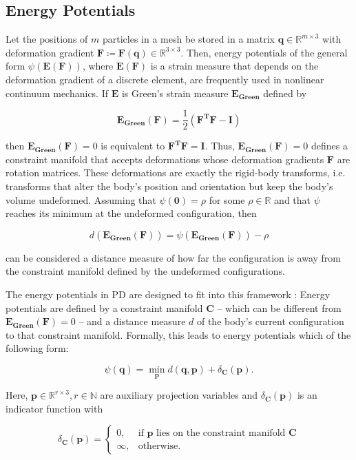 \subsection{Energy Potentials}\label{ss:pd-potentials}

Let the positions of $m$ particles in a mesh be stored in a matrix $\bm{q} \in \mathbb{R}^{m \times 3}$ with deformation gradient $\bm{F} 
\coloneqq \bm{F(\bm{q})} \in \mathbb{R}^{3 \times 3}$. Then, energy potentials of the general form $\psi(\bm{E}(\bm{F}))$, where 
$\bm{E}(\bm{F})$ is a strain measure that depends on the deformation gradient of a discrete element, are frequently used in nonlinear 
continuum mechanics. If $\bm{E}$ is Green's strain measure $\bm{E_{\text{Green}}}$ defined by 

\[
\bm{E_{\text{Green}}}(\bm{F}) = \frac{1}{2}(\bm{F^TF} - \bm{I})
\]

\noindent then $\bm{E_{\text{Green}}}(\bm{F}) = 0$ is equivalent to $\bm{F^TF} = \bm{I}$. Thus, $\bm{E_{\text{Green}}}(\bm{F}) = 0$ defines a constraint
manifold that accepts deformations whose deformation gradients $\bm{F}$ are rotation matrices. These deformations are exactly the rigid-body 
transforms, i.e. transforms that alter the body's position and orientation but keep the body's volume undeformed. Assuming that $\psi(\bm{0}) 
= \rho$ for some $\rho \in \mathbb{R}$ and that $\psi$ reaches its minimum at the undeformed configuration, then 

\[
    d(\bm{E_{\text{Green}}}(\bm{F})) = \psi(\bm{E_{\text{Green}}}(\bm{F})) - \rho
\]

\noindent can be considered a distance measure of how far the configuration is away from the constraint manifold defined by the undeformed 
configurations. 

The energy potentials in PD are designed to fit into this framework \cite{bouaziz2014}: Energy potentials are defined by a constraint 
manifold $\bm{C}$ -- which 
can be different from $\bm{E_{\text{Green}}(\bm{F})} = 0$ -- and a distance measure $d$ of the body's current configuration to that constraint 
manifold. Formally, this leads to energy potentials which of the 
following form:

\[
    \psi({\bm{q}}) = \min_{\bm{p}} d(\bm{q}, \bm{p}) + \delta_{\bm{C}}(\bm{p}).
\]

\noindent Here, $\bm{p} \in \mathbb{R}^{r \times 3}, r \in \mathbb{N}$ are auxiliary projection variables and $\delta_{\bm{C}}(\bm{p})$ is an indicator function with 

\[
    \delta_{\bm{C}}(\bm{p})= 
\begin{cases}
0,& \text{if } \bm{p} \text{ lies on the constraint manifold } \bm{C}\\
\infty,& \text{otherwise.}
\end{cases}
\]

